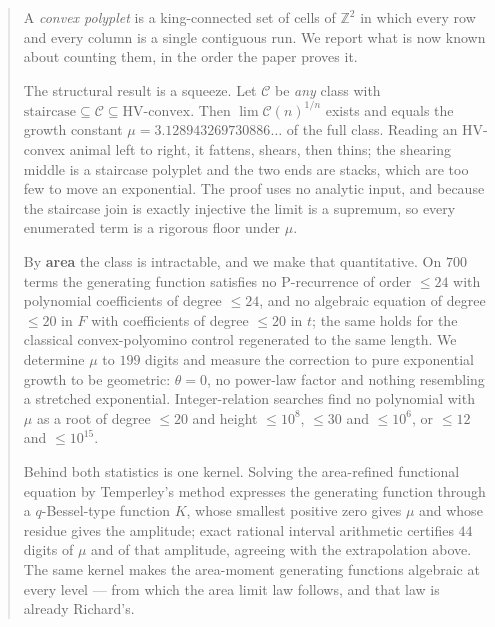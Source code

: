 \documentclass[11pt]{article}
\newcommand{\Z}{\mathbb{Z}}
\begin{document}
\begin{abstract}
\noindent
A \emph{convex polyplet} is a king-connected set of cells of $\Z^2$ in which
every row and every column is a single contiguous run. We report what is now
known about counting them, in the order the paper proves it.

The structural result is a squeeze. Let $\mathcal C$ be \emph{any} class with
$\text{staircase} \subseteq \mathcal C \subseteq \text{HV-convex}$. Then
$\lim \mathcal C(n)^{1/n}$ exists and equals the growth constant
$\mu = 3.128943269730886\dots$ of the full class. Reading an HV-convex animal
left to right, it fattens, shears, then thins; the shearing middle is a
staircase polyplet and the two ends are stacks, which are too few to move an
exponential. The proof uses no analytic input, and because the staircase join is
exactly injective the limit is a supremum, so every enumerated term is a rigorous
floor under $\mu$.

By \textbf{area} the class is intractable, and we make that quantitative. On
$700$ terms the generating function satisfies no P-recurrence of order $\le 24$
with polynomial coefficients of degree $\le 24$, and no algebraic equation of
degree $\le 20$ in $F$ with coefficients of degree $\le 20$ in $t$; the same
holds for the classical convex-polyomino control regenerated to the same length.
We determine $\mu$ to $199$ digits and measure the correction to pure exponential
growth to be geometric: $\theta = 0$, no power-law factor and nothing resembling
a stretched exponential. Integer-relation searches find no polynomial with $\mu$
as a root of degree $\le 20$ and height $\le 10^8$, $\le 30$ and $\le 10^6$, or
$\le 12$ and $\le 10^{15}$.

Behind both statistics is one kernel. Solving the area-refined functional
equation by Temperley's method expresses the generating function through a
$q$-Bessel-type function $K$, whose smallest positive zero gives $\mu$ and whose
residue gives the amplitude; exact rational interval arithmetic certifies
$44$ digits of $\mu$ and of that amplitude, agreeing with the extrapolation
above. The same kernel makes the area-moment generating functions algebraic at
every level --- from which the area limit law follows, and that law is already
Richard's.


\end{abstract}
\end{document}
